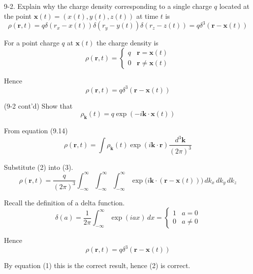 \documentclass[12pt]{article}
\begin{document}
9-2.
Explain why the charge density corresponding to a single
charge $q$ located at the point $\mathbf x(t)=(x(t),y(t),z(t))$
at time $t$ is
\begin{equation*}
\rho(\mathbf r,t)=q
\delta(r_x-x(t))
\delta(r_y-y(t))
\delta(r_z-z(t))
=q\delta^3(\mathbf r-\mathbf x(t))
\end{equation*}

For a point charge $q$ at $\mathbf x(t)$ the charge density is
\begin{equation*}
\rho(\mathbf r,t)
=\begin{cases}
q & \mathbf r=\mathbf x(t)
\\
0 & \mathbf r\ne\mathbf x(t)
\end{cases}
\end{equation*}

Hence
\begin{equation*}
\rho(\mathbf r,t)=q\delta^3(\mathbf r-\mathbf x(t))
\tag{1}
\end{equation*}

(9-2 cont'd)
Show that
\begin{equation*}
\rho_{\mathbf k}(t)=q\exp(-i\mathbf k\cdot\mathbf x(t))
\tag{2}
\end{equation*}

From equation (9.14)
\begin{equation*}
\rho(\mathbf r,t)=\int\rho_{\mathbf k}(t)
\exp(i\mathbf k\cdot\mathbf r)
\frac{d^3\mathbf k}{(2\pi)^3}
\tag{3}
\end{equation*}

Substitute (2) into (3).
\begin{equation*}
\rho(\mathbf r,t)=\frac{q}{(2\pi)^3}
\int_{-\infty}^\infty
\int_{-\infty}^\infty
\int_{-\infty}^\infty
\exp\big(i\mathbf k\cdot(\mathbf r-\mathbf x(t))\big)
\,dk_x\,dk_y\,dk_z
\end{equation*}

Recall the definition of a delta function.
\begin{equation*}
\delta(a)=\frac{1}{2\pi}\int_{-\infty}^\infty\exp(iax)\,dx
=\begin{cases}
1 & a=0
\\
0 & a\ne0
\end{cases}
\end{equation*}

Hence
\begin{equation*}
\rho(\mathbf r,t)=q\delta^3(\mathbf r-\mathbf x(t))
\end{equation*}

By equation (1) this is the correct result,
hence (2) is correct.
\end{document}
